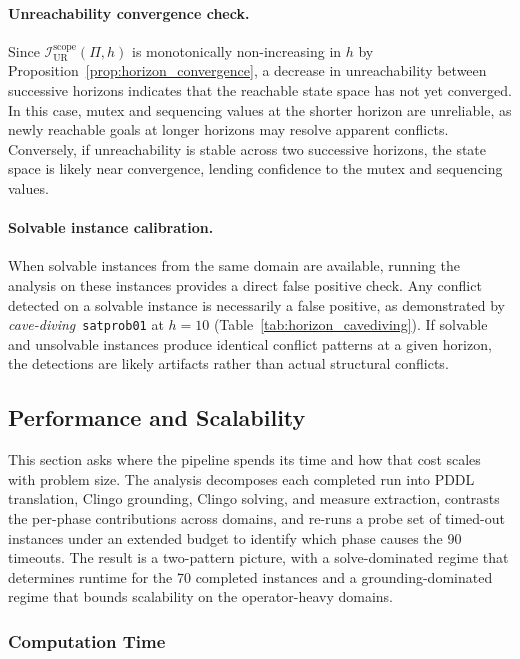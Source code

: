 \paragraph{Unreachability convergence check.} Since $\mathcal{I}^{\text{scope}}_{\text{UR}}(\Pi, h)$ is monotonically non-in\-creasing in $h$ by Proposition~\ref{prop:horizon_convergence}, a decrease in unreachability between successive horizons indicates that the reachable state space has not yet converged. In this case, mutex and sequencing values at the shorter horizon are unreliable, as newly reachable goals at longer horizons may resolve apparent conflicts. Conversely, if unreachability is stable across two successive horizons, the state space is likely near convergence, lending confidence to the mutex and sequencing values.

\paragraph{Solvable instance calibration.} When solvable instances from the same domain are available, running the analysis on these instances provides a direct false positive check. Any conflict detected on a solvable instance is necessarily a false positive, as demonstrated by \textit{cave-diving}~\texttt{satprob01} at $h = 10$ (Table~\ref{tab:horizon_cavediving}). If solvable and unsolvable instances produce identical conflict patterns at a given horizon, the detections are likely artifacts rather than actual structural conflicts.

\subsection{Performance and Scalability}
\label{sec:eval_performance}

This section asks where the pipeline spends its time and how that cost scales with problem size. The analysis decomposes each completed run into \ac{PDDL} translation, Clingo grounding, Clingo solving, and measure extraction, contrasts the per-phase contributions across domains, and re-runs a probe set of timed-out instances under an extended budget to identify which phase causes the 90 timeouts. The result is a two-pattern picture, with a solve-dominated regime that determines runtime for the 70 completed instances and a grounding-dominated regime that bounds scalability on the operator-heavy domains.

\subsubsection{Computation Time}

